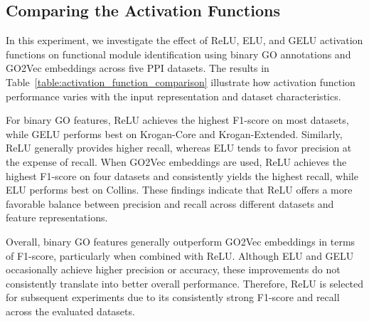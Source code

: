 \subsection{Comparing the Activation Functions}

In this experiment, we investigate the effect of ReLU, ELU, and GELU activation functions on functional module identification using binary GO annotations and GO2Vec embeddings across five PPI datasets. The results in Table~\ref{table:activation_function_comparison} illustrate how activation function performance varies with the input representation and dataset characteristics.

For binary GO features, ReLU achieves the highest F1-score on most datasets, while GELU performs best on Krogan-Core and Krogan-Extended. Similarly, ReLU generally provides higher recall, whereas ELU tends to favor precision at the expense of recall. When GO2Vec embeddings are used, ReLU achieves the highest F1-score on four datasets and consistently yields the highest recall, while ELU performs best on Collins. These findings indicate that ReLU offers a more favorable balance between precision and recall across different datasets and feature representations.

Overall, binary GO features generally outperform GO2Vec embeddings in terms of F1-score, particularly when combined with ReLU. Although ELU and GELU occasionally achieve higher precision or accuracy, these improvements do not consistently translate into better overall performance. Therefore, ReLU is selected for subsequent experiments due to its consistently strong F1-score and recall across the evaluated datasets.





